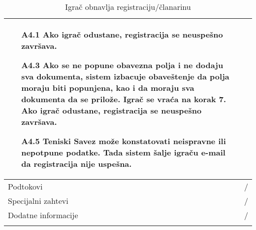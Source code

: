 \documentclass{article}
\begin{document}
\begin{longtable}{| p{} | p{} |}
\begin{itemize}
                    \item[A4.1] Ako igrač odustane, registracija se neuspešno završava.
                    \item[A4.3] Ako se ne popune obavezna polja i ne dodaju sva dokumenta, sistem izbacuje obaveštenje da polja moraju biti popunjena, kao i da moraju sva dokumenta da se prilože. Igrač se vraća na korak 7. Ako igrač odustane, registracija se neuspešno završava.
                    \item[A4.5] Teniski Savez može konstatovati neispravne ili nepotpune podatke. Tada sistem šalje igraču e-mail da registracija nije uspešna.
                \end{itemize}\\
            \hline
                Podtokovi & /\\
            \hline
                Specijalni zahtevi & /\\
            \hline
                Dodatne informacije & / \\
            \hline
            \caption{Igrač obnavlja registraciju/članarinu}
        \end{longtable}
        
\end{document}
